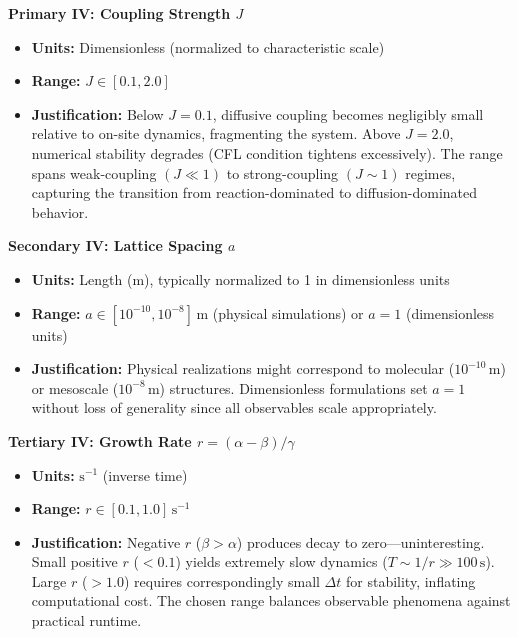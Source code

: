 \documentclass[
]{article}
\providecommand{\tightlist}{%
  \setlength{\itemsep}{0pt}\setlength{\parskip}{0pt}}
\begin{document}
\textbf{Primary IV: Coupling Strength \(J\)}

\begin{itemize}
\tightlist
\item
  \textbf{Units:} Dimensionless (normalized to characteristic scale)
\item
  \textbf{Range:} \(J \in [0.1, 2.0]\)
\item
  \textbf{Justification:} Below \(J=0.1\), diffusive coupling becomes
  negligibly small relative to on-site dynamics, fragmenting the system.
  Above \(J=2.0\), numerical stability degrades (CFL condition tightens
  excessively). The range spans weak-coupling \((J \ll 1)\) to
  strong-coupling \((J \sim 1)\) regimes, capturing the transition from
  reaction-dominated to diffusion-dominated behavior.
\end{itemize}

\textbf{Secondary IV: Lattice Spacing \(a\)}

\begin{itemize}
\tightlist
\item
  \textbf{Units:} Length (m), typically normalized to 1 in dimensionless
  units
\item
  \textbf{Range:} \(a \in [10^{-10}, 10^{-8}]\,\mathrm{m}\) (physical
  simulations) or \(a=1\) (dimensionless units)
\item
  \textbf{Justification:} Physical realizations might correspond to
  molecular (\(10^{-10}\,\mathrm{m}\)) or mesoscale
  (\(10^{-8}\,\mathrm{m}\)) structures. Dimensionless formulations set
  \(a=1\) without loss of generality since all observables scale
  appropriately.
\end{itemize}

\textbf{Tertiary IV: Growth Rate \(r = (\alpha-\beta)/\gamma\)}

\begin{itemize}
\tightlist
\item
  \textbf{Units:} \(\mathrm{s}^{-1}\) (inverse time)
\item
  \textbf{Range:} \(r \in [0.1, 1.0] \, \mathrm{s}^{-1}\)
\item
  \textbf{Justification:} Negative \(r\) (\(\beta > \alpha\)) produces
  decay to zero---uninteresting. Small positive \(r\) (\(< 0.1\)) yields
  extremely slow dynamics (\(T \sim 1/r \gg 100\,\mathrm{s}\)). Large
  \(r\) (\(> 1.0\)) requires correspondingly small \(\Delta t\) for
  stability, inflating computational cost. The chosen range balances
  observable phenomena against practical runtime.
\end{itemize}
\end{document}

